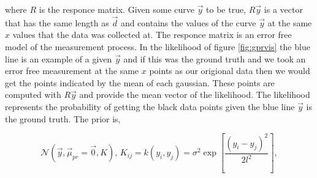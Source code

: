 \noindent where $R$ is the responce matrix. Given some curve $\vec y$ to be true, $R \vec y$ is a vector that has the same length as $\vec d$ and contains the values of the curve $\vec y$ at the same $x$ values that the data was collected at. The responce matrix is an error free model of the measurement process. In the likelihood of figure \ref{fig:gprvis} the blue line is an example of a given $\vec{y}$ and if this was the ground truth and we took an error free measurement at the same $x$ points as our origional data then we would get the points indicated by the mean of each gaussian. These points are computed with $R\vec y$ and provide the mean vector of the likelihood. The likelihood represents the probability of getting the black data points given the blue line $\vec y$ is the ground truth. The prior is,

\begin{equation}
  \mathcal{N}(\vec{y}, \vec \mu_{pr} = \vec{0}, K), \, K_{ij} = k(y_i, y_j) = \sigma^2 \exp\left[{\frac{(y_i - y_j)^2}{2l^2}}\right], 
  \label{eq:prior}
\end{equation}

